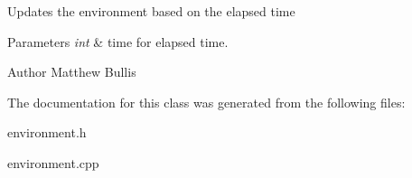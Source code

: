 Updates the environment based on the elapsed time 
\begin{DoxyParams}{Parameters}
{\em int} & time for elapsed time. \\
\hline
\end{DoxyParams}
\begin{DoxyAuthor}{Author}
Matthew Bullis 
\end{DoxyAuthor}


The documentation for this class was generated from the following files\-:\begin{DoxyCompactItemize}
\item 
environment.\-h\item 
environment.\-cpp\end{DoxyCompactItemize}
